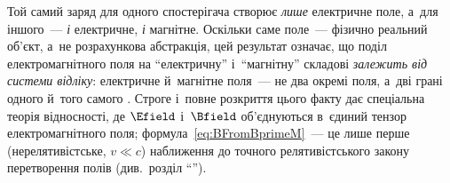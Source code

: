 \begin{Attention}
	Той самий заряд для одного спостерігача створює \emph{лише} електричне поле, а~для
	іншого~--- \emph{і} електричне, \emph{і} магнітне. Оскільки саме поле~--- фізично
	реальний об'єкт, а~не розрахункова абстракція, цей результат означає, що поділ
	електромагнітного поля на \enquote{електричну} і~\enquote{магнітну} складові
	\emph{залежить від системи відліку}: електричне й~магнітне поля~--- не два окремі
	поля, а~дві грані одного й~того самого . Строге і~повне
	розкриття цього факту дає спеціальна теорія відносності, де $\Efield$ і~$\Bfield$
	об'єднуються в~єдиний тензор електромагнітного поля;
	формула~\eqref{eq:BFromBprimeM}~--- це лише перше (нерелятивістське, $v\ll c$)
	наближення до точного релятивістського закону перетворення полів (див.~розділ
	\enquote{}).
\end{Attention}

